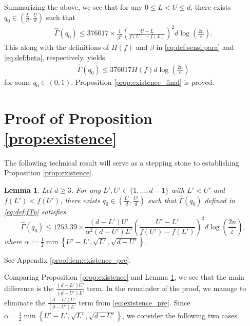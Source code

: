 \documentclass[onecolumn,letterpaper]{IEEEtran}
\newtheorem{lemma}{Lemma}
\newcommand{\cp}{{q}}
\newcommand{\up}{{U}}
\newcommand{\lw}{{L}}
\newcommand{\ap}{{\alpha}}
\newcommand{\fH}{{H(f)}}
\newcommand{\bet}{{\beta}}
\newcommand{\exifinal}{{ 376017 \times \frac{1}{\bet^2} \left( \frac{\up-\lw}{f(\up)-f(\lw)} \right)^2  d\log \left( \frac{2n}{\varepsilon } \right)}}
\newcommand{\ftaup}{{\hat{\Gamma}}}
\newcommand{\cpns}{\cp_0}
\newcommand{\fTpns}{\ftaup (\cpns)}
\begin{document}
Summarizing the above, we see that for any $0\leq \lw<\up\leq d$, there exists $\cpns \in \left( \frac{\lw}{d} , \frac{\up}{d} \right)$ such that
\begin{align*}
    \fTpns \leq \exifinal .
\end{align*}
This along with the definitions of $\fH$ and $\bet$ in \eqref{eq:def:sensi:para} and \eqref{eq:def:beta}, respectively, yields
\begin{align}
    \fTpns \leq 376017 \fH d\log \left( \frac{2n}{\varepsilon } \right) 
\end{align}
for some $\cpns\in (0,1)$.  Proposition \ref{prop:existence_final} is proved. %

\section{Proof of Proposition \ref{prop:existence}}
\label{sec:existence}
 The following technical result will serve as a stepping stone to establishing Proposition \ref{prop:existence}. 
\begin{lemma}
\label{lem:existence_pre}
Let $d\geq 3$. For any $\lw',\up' \in \{1 ,\dots, d-1\}$ with $\lw' < \up'$ and $f(\lw')<f(\up')$, there exists $\cpns \in \left(\frac {\lw'} {d}, \frac {\up'} {d}\right)$ such that $\fTpns $ defined in \eqref{eq:def:fTp} satisfies 
\begin{equation} 
\label{eq:existence_pre}
\fTpns  \leq 1253.39 \times \frac{ (d-\lw') \up' }{\ap^2 (d-\up')\lw'} \left( \frac{\up'-\lw'}{f(\up')-f(\lw')} \right)^2  d\log \left( \frac{2n}{\varepsilon } \right),
\end{equation} 
where $\ap := \frac{1}{2} \min\left\{\up'-\lw',\sqrt{\lw'},\sqrt{d-\up'}\right\}$.
\end{lemma}

\begin{IEEEproof}
See Appendix \ref{proof:lem:existence_pre}.
\end{IEEEproof}
Comparing Proposition \ref{prop:existence} and Lemma \ref{lem:existence_pre}, we see that the main difference is the $\frac{ (d-\lw') \up' }{(d-\up')\lw'}$ term. In the remainder of the proof, we manage to eliminate the $\frac{ (d-\lw') \up' }{(d-\up')\lw'}$ term from \eqref{eq:existence_pre}. Since $\ap = \frac{1}{2} \min\left\{\up'-\lw',\sqrt{\lw'},\sqrt{d-\up'}\right\}$, we consider the following two cases.
\end{document}
